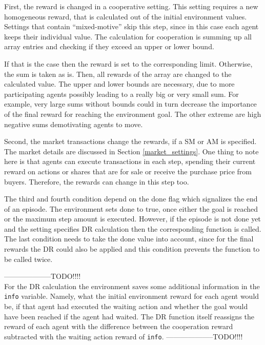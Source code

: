 First, the reward is changed in a cooperative setting. This setting requires a new homogeneous reward, that is calculated out of the initial environment values. Settings that contain ``mixed-motive'' skip this step, since in this case each agent keeps their individual value. The calculation for cooperation is summing up all array entries and checking if they exceed an upper or lower bound. 

If that is the case then the reward is set to the corresponding limit. Otherwise, the sum is taken as is. Then, all rewards of the array are changed to the calculated value. The upper and lower bounds are necessary, due to more participating agents possibly leading to a really big or very small sum. For example, very large sums without bounds could in turn decrease the importance of the final reward for reaching the environment goal. The other extreme are high negative sums demotivating agents to move.

Second, the market transactions change the rewards, if a SM or AM is specified. The market details are discussed in Section \ref{market_settings}. One thing to note here is that agents can execute transactions in each step, spending their current reward on actions or shares that are for sale or receive the purchase price from buyers. Therefore, the rewards can change in this step too.

The third and fourth condition depend on the done flag which signalizes the end of an episode. The environment sets done to true, once either the goal is reached or the maximum step amount is executed. However, if the episode is not done yet and the setting specifies DR calculation then the corresponding function is called. The last condition needs to take the done value into account, since for the final rewards the DR could also be applied and this condition prevents the function to be called twice. 

--------------------TODO!!!!\\
For the DR calculation the environment saves some additional information in the \verb|info| variable. Namely, what the initial environment reward for each agent would be, if that agent had executed the waiting action and whether the goal would have been reached if the agent had waited. The DR function itself reassigns the reward of each agent with the difference between the cooperation reward subtracted with the waiting action reward of \verb|info|. 
--------------------TODO!!!!\\

